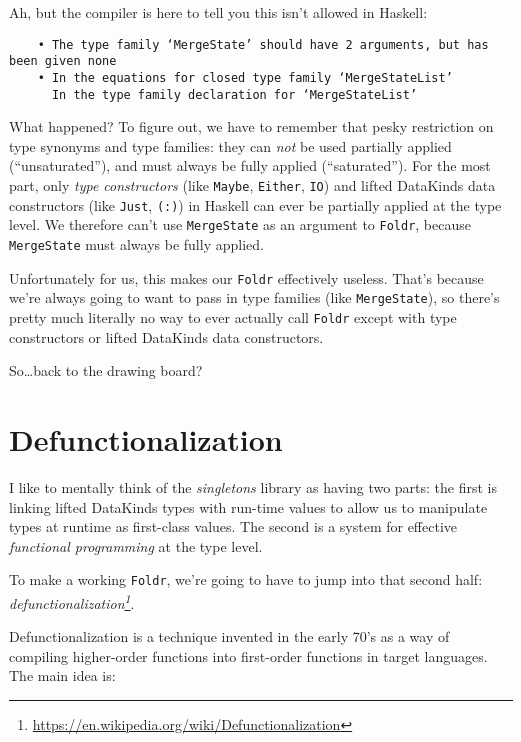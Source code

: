 \documentclass[]{article}
\renewcommand{\href}[2]{#2\footnote{\url{#1}}}
\begin{document}
Ah, but the compiler is here to tell you this isn't allowed in Haskell:

\begin{verbatim}
    • The type family ‘MergeState’ should have 2 arguments, but has been given none
    • In the equations for closed type family ‘MergeStateList’
      In the type family declaration for ‘MergeStateList’
\end{verbatim}

What happened? To figure out, we have to remember that pesky restriction on type
synonyms and type families: they can \emph{not} be used partially applied
(``unsaturated''), and must always be fully applied (``saturated''). For the
most part, only \emph{type constructors} (like \texttt{Maybe}, \texttt{Either},
\texttt{IO}) and lifted DataKinds data constructors (like
\texttt{\textquotesingle{}Just}, \texttt{\textquotesingle{}(:)}) in Haskell can
ever be partially applied at the type level. We therefore can't use
\texttt{MergeState} as an argument to \texttt{Foldr}, because
\texttt{MergeState} must always be fully applied.

Unfortunately for us, this makes our \texttt{Foldr} effectively useless. That's
because we're always going to want to pass in type families (like
\texttt{MergeState}), so there's pretty much literally no way to ever actually
call \texttt{Foldr} except with type constructors or lifted DataKinds data
constructors.

So\ldots{}back to the drawing board?

\hypertarget{defunctionalization}{%
\section{Defunctionalization}\label{defunctionalization}}

I like to mentally think of the \emph{singletons} library as having two parts:
the first is linking lifted DataKinds types with run-time values to allow us to
manipulate types at runtime as first-class values. The second is a system for
effective \emph{functional programming} at the type level.

To make a working \texttt{Foldr}, we're going to have to jump into that second
half:
\emph{\href{https://en.wikipedia.org/wiki/Defunctionalization}{defunctionalization}}.

Defunctionalization is a technique invented in the early 70's as a way of
compiling higher-order functions into first-order functions in target languages.
The main idea is:
\end{document}
